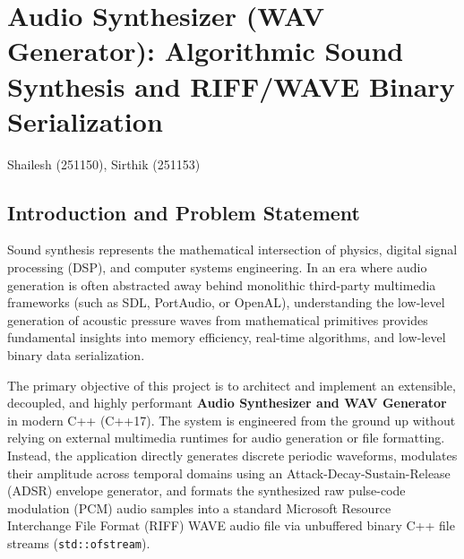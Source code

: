 \documentclass[12pt,a4paper,oneside]{book}
\makeatletter
\newcommand{\chapterauthor}[1]{%
  {\parindent0pt\vspace*{-15pt}%
  \linespread{1.1}\large\itshape\begin{flushright}#1\end{flushright}%
  \par\nobreak\vspace*{25pt}}
  \@afterheading%
}
\makeatother
\begin{document}
\mainmatter


\setcounter{chapter}{23}

\chapter[Audio Synthesizer (WAV Generator)]{Audio Synthesizer (WAV Generator): Algorithmic Sound Synthesis and RIFF/WAVE Binary Serialization}
\chapterauthor{Shailesh (251150), Sirthik (251153)}

\section{Introduction and Problem Statement}
Sound synthesis represents the mathematical intersection of physics, digital signal processing (DSP), and computer systems engineering. In an era where audio generation is often abstracted away behind monolithic third-party multimedia frameworks (such as SDL, PortAudio, or OpenAL), understanding the low-level generation of acoustic pressure waves from mathematical primitives provides fundamental insights into memory efficiency, real-time algorithms, and low-level binary data serialization.

The primary objective of this project is to architect and implement an extensible, decoupled, and highly performant \textbf{Audio Synthesizer and WAV Generator} in modern C++ (C++17). The system is engineered from the ground up without relying on external multimedia runtimes for audio generation or file formatting. Instead, the application directly generates discrete periodic waveforms, modulates their amplitude across temporal domains using an Attack-Decay-Sustain-Release (ADSR) envelope generator, and formats the synthesized raw pulse-code modulation (PCM) audio samples into a standard Microsoft Resource Interchange File Format (RIFF) WAVE audio file via unbuffered binary C++ file streams (\texttt{std::ofstream}).
\end{document}

